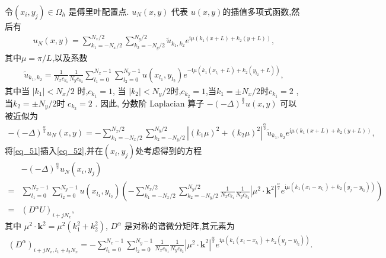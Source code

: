 令$\left(x_{i}, y_{j}\right) \in \Omega_{h}$ 是傅里叶配置点. $u_{N}(x, y)$ 代表
$u(x, y)$的插值多项式函数,然后有
\begin{align}\label{eq_50}
u_{N}(x, y)=\sum_{k_{1}=-N_{x} / 2}^{N_{x} / 2} \sum_{k_{2}=-N_{y} / 2}^{N_{y} / 2} \tilde{u}_{k_{1}, k_{2}} e^{\mathrm{i}\mu\left( k_{1} (x+L)+k_{2}(y+L)\right)},
\end{align}
其中$\mu={\pi}/{L}$,以及系数
\begin{align}\label{eq_51}
\tilde{u}_{k_{1}, k_{2}}=\frac{1}{N_{x} c_{k_{1}}} \frac{1}{N_{y} c_{k_{2}}} \sum_{l_1=0}^{N_{x}-1} \sum_{l_2=0}^{N_{y}-1} u(x_{l_1}, y_{l_2}) e^{-\mathrm{i}\mu\left( k_{1}(x_{l_1}+L)+k_{2}(y_{l_2}+L)\right)},
\end{align}
其中当 $\left|k_{1}\right|<N_{x} / 2$ 时,$c_{k_{1}}=1$, 当 $\left|k_{2}\right|<N_{y} / 2$时,$c_{k_{2}}=1$,当$k_{1}=\pm N_{x} / 2$时$ c_{k_{1}}=2$ , 当$k_{2}=\pm N_{y} / 2$时 $c_{k_{2}}=2$ .
因此, 分数阶 Laplacian 算子 $-(-\Delta)^{\frac{\alpha}{2}} u(x, y)$ 可以被近似为
\begin{align}\label{eq_52}
-(-\Delta)^{\frac{\alpha}{2}} u_{N}\left(x, y\right)=-\sum\limits_{k_{1}=-N_{x} / 2}^{N_{x} / 2} \sum\limits_{k_{2}=-N_{y} / 2}^{N_{y} / 2}\left|\left(k_{1} \mu\right)^{2}+\left(k_{2} \mu\right)^{2}\right|^{\frac{\alpha}{2}} \tilde{u}_{k_{1}, k_{2}} e^{\mathrm{i}\mu\left( k_{1} (x+L)+k_{2}(y+L)\right)},
\end{align}
将\eqref{eq_51}插入\eqref{eq_52},并在$(x_i,y_j)$处考虑得到的方程
\begin{align}
&-(-\Delta)^{\frac{\alpha}{2}} u_{N}\left(x_{i}, y_{j}\right)\nonumber\\
=&\sum\limits_{l_{1}=0}^{N_{x}-1} \sum\limits_{l_{2}=0}^{N_{y}-1}u(x_{l_{1}}, y_{l_{2}})\left(-\sum\limits_{k_{1}=-N_{x} / 2}^{N_{x} / 2} \sum\limits_{k_{2}=-N_{y} / 2}^{N_{y} / 2} \frac{1}{N_{x} c_{k_{1}}} \frac{1}{N_{y} c_{k_{2}}}\left|\mu^{2} \cdot \mathbf{k}^{2}\right|^{\frac{\alpha}{2}} e^{\mathrm{i} \mu\left(k_{1}\left(x_{i}-x_{l_{1}}\right)+k_{2}\left(y_{j}-y_{l_{2}}\right)\right)}\right)\nonumber\\
=&\left(D^{\alpha}U\right)_{i+j N_{x}},\label{eq_53}
\end{align}
其中 $\mu^{2} \cdot \mathbf{k}^{2}=\mu^{2}\left(k_{1}^{2}+k_{2}^{2}\right)$, $D^{\alpha}$ 是对称的谱微分矩阵,其元素为
\begin{align}\label{eq_54}
\left(D^{\alpha}\right)_{i+j N_{x}, l_{1}+l_{2} N_{x}}=-\sum\limits_{l_{1}=0}^{N_{x}-1} \sum\limits_{l_{2}=0}^{N_{y}-1}\frac{1}{N_{x} c_{k_{1}}} \frac{1}{N_{y} c_{k_{2}}}\left|\mu^{2} \cdot \mathbf{k}^{2}\right|^{\frac{\alpha}{2}} e^{\mathrm{i}\mu\left(k_{1}\left(x_{i}-x_{l_{1}}\right)+k_{2}\left(y_{j}-y_{l_{2}}\right)\right)}.
\end{align}


